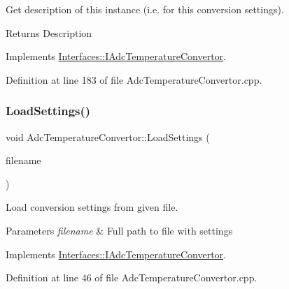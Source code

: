 Get description of this instance (i.\+e. for this conversion settings). 

\begin{DoxyReturn}{Returns}
Description 
\end{DoxyReturn}


Implements \hyperlink{class_interfaces_1_1_i_adc_temperature_convertor_a2f3b59be793c3ed43e880ef12e9749bc}{Interfaces\+::\+I\+Adc\+Temperature\+Convertor}.



Definition at line 183 of file Adc\+Temperature\+Convertor.\+cpp.

\mbox{\label{class_adc_temperature_convertor_affab0a66a3508e2eedd8bab3407ae80f}} 
\subsubsection{\texorpdfstring{Load\+Settings()}{LoadSettings()}}
{\footnotesize\ttfamily void Adc\+Temperature\+Convertor\+::\+Load\+Settings (\begin{DoxyParamCaption}\item[{Q\+String}]{filename }\end{DoxyParamCaption})\hspace{0.3cm}{\ttfamily [virtual]}}



Load conversion settings from given file. 


\begin{DoxyParams}{Parameters}
{\em filename} & Full path to file with settings \\
\hline
\end{DoxyParams}


Implements \hyperlink{class_interfaces_1_1_i_adc_temperature_convertor_a9697a0319f82ebd1fc20f5e24d3b191c}{Interfaces\+::\+I\+Adc\+Temperature\+Convertor}.



Definition at line 46 of file Adc\+Temperature\+Convertor.\+cpp.

\mbox{\label{class_adc_temperature_convertor_aa6935469c6bb9e2df9a21495d7e8b72a}} 
